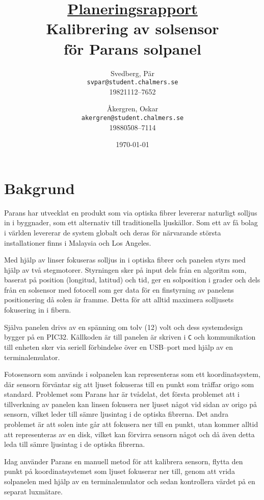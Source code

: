 \documentclass{article}
\author{Svedberg, Pär\\ \texttt{svpar@student.chalmers.se}  \\ 
            19821112--7652 \and
            Åkergren, Oskar\\ \texttt{akergren@student.chalmers.se}  \\ 19880508--7114
}
\title{\vspace{2cm} \underline{Planeringsrapport} \\ Kalibrering av solsensor \\ för Parans solpanel \vspace{1cm}}
\date{\vspace{8cm}\today}
\begin{document}
\maketitle
\thispagestyle{empty}

\newpage
\setcounter{page}{1}

\section{Bakgrund} %
\label{sec:bakgrund}

    Parans har utvecklat en produkt som via optiska fibrer levererar naturligt solljus in i byggnader, som ett alternativ till traditionella ljuskällor. Som ett av få bolag i världen levererar de system globalt och deras för närvarande största installationer finns i Malaysia och Los Angeles. \bigskip

    Med hjälp av linser fokuseras solljus in i optiska fibrer och panelen styrs med hjälp av två stegmotorer. Styrningen sker på input dels från en algoritm som, baserat på position (longitud, latitud) och tid, ger en solposition i grader och dels från en solsensor med fotocell som ger data för en finstyrning av panelens positionering då solen är framme.
    Detta för att alltid maximera solljusets fokusering in i fibern.\bigskip

    Själva panelen drivs av en spänning om tolv (12) volt och dess systemdesign bygger på en PIC32. Källkoden är till panelen är skriven i \texttt{C} och kommunikation till enheten sker via seriell förbindelse över en USB–port med hjälp av en terminalemulator. \bigskip

    Fotosensorn som används i solpanelen kan representeras som ett koordinatsystem, där sensorn förväntar sig att ljuset fokuseras till en punkt som träffar origo som standard. Problemet som Parans har är tvådelat, det första problemet att i tillverkning av panelen kan linsen fokusera ner ljuset något vid sidan av origo på sensorn, vilket leder till sämre ljusintag i de optiska fibrerna. Det andra problemet är att solen inte går att fokusera ner till en punkt, utan kommer alltid att representeras av en disk, vilket kan förvirra sensorn något och då även detta leda till sämre ljusintag i de optiska fibrerna. \bigskip

    Idag använder Parans en manuell metod för att kalibrera sensorn, flytta den punkt på koordinatsystemet som ljuset fokuserar ner till, genom att vrida solpanelen med hjälp av en terminalemulator och sedan kontrollera värdet på en separat luxmätare.
\end{document}
